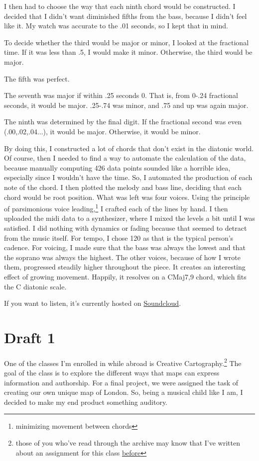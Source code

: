 \documentclass[12pt]{article}[titlepage]
\newcommand{\1}{\={a}}
\newcommand{\2}{\={e}}
\newcommand{\3}{\={\i}}
\newcommand{\4}{\=o}
\newcommand{\5}{\=u}
\newcommand{\6}{\={A}}
\renewcommand{\,}{\textsuperscript{,}}
\begin{document}
I then had to choose the way that each ninth chord would be constructed.
I decided that I didn't want diminished fifths from the bass, because I didn't feel like it.
My watch was accurate to the .01 seconds, so I kept that in mind.

To decide whether the third would be major or minor, I looked at the fractional time.
If it was less than .5, I would make it minor.
Otherwise, the third would be major.

The fifth was perfect.

The seventh was major if within .25 seconds 0.
That is, from 0-.24 fractional seconds, it would be major.
.25-.74 was minor, and .75 and up was again major.

The ninth was determined by the final digit.
If the fractional second was even (.00,.02,.04...), it would be major.
Otherwise, it would be minor.

By doing this, I constructed a lot of chords that don't exist in the diatonic world.
Of course, then I needed to find a way to automate the calculation of the data, because manually computing 426 data points sounded like a horrible idea, especially since I wouldn't have the time.
So, I automated the production of each note of the chord.
I then plotted the melody and bass line, deciding that each chord would be root position.
What was left was four voices.
Using the principle of parsimonious voice leading,\footnote{minimizing movement between chords} I crafted each of the lines by hand.
I then uploaded the midi data to a synthesizer, where I mixed the levels a bit until I was satisfied.
I did nothing with dynamics or fading because that seemed to detract from the music itself.
For tempo, I chose 120 as that is the typical person's cadence.
For voicing, I made sure that the bass was always the lowest and that the soprano was always the highest.
The other voices, because of how I wrote them, progressed steadily higher throughout the piece.
It creates an interesting effect of growing movement.
Happily, it resolves on a CMaj7,9 chord, which fits the C diatonic scale.

If you want to listen, it's currently hosted on \href{https://soundcloud.com/user-700800182/walk-26-november-2018}{Soundcloud}. 

\section{Draft 1}
One of the classes I'm enrolled in while abroad is Creative Cartography.\footnote{those of you who've read through the archive may know that I've written about an assignment for this class \href{riverwalk.html}{before}}
The goal of the class is to explore the different ways that maps can express information and authorship.
For a final project, we were assigned the task of creating our own unique map of London.
So, being a musical child like I am, I decided to make my end product something auditory.
\end{document}
